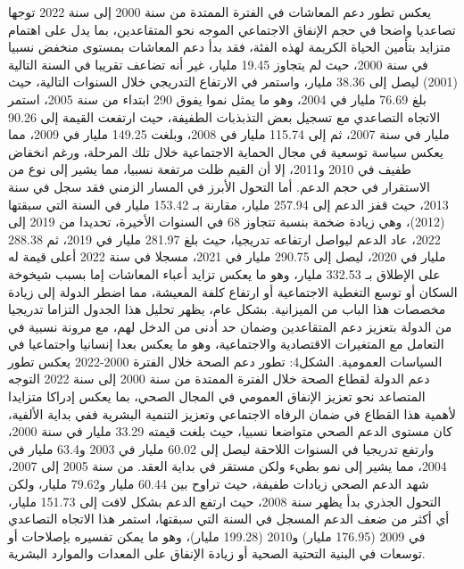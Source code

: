 \documentclass[12pt,a4paper]{report}
\begin{document}
يعكس تطور دعم المعاشات في الفترة الممتدة من سنة 2000 إلى سنة 2022 توجها تصاعديا واضحا في حجم الإنفاق الاجتماعي الموجه نحو المتقاعدين، بما يدل على اهتمام متزايد بتأمين الحياة الكريمة لهذه الفئة، فقد بدأ دعم المعاشات بمستوى منخفض نسبيا في سنة 2000، حيث لم يتجاوز 19.45 مليار، غير أنه تضاعف تقريبا في السنة التالية (2001) ليصل إلى 38.36 مليار، واستمر في الارتفاع التدريجي خلال السنوات التالية، حيث بلغ 76.69 مليار في 2004، وهو ما يمثل نموا يفوق 290%
ابتداء من سنة 2005، استمر الاتجاه التصاعدي مع تسجيل بعض التذبذبات الطفيفة، حيث ارتفعت القيمة إلى 90.26 مليار في سنة 2007، ثم إلى 115.74 مليار في 2008، وبلغت 149.25 مليار في 2009، مما يعكس سياسة توسعية في مجال الحماية الاجتماعية خلال تلك المرحلة، ورغم انخفاض طفيف في 2010 و2011، إلا أن القيم ظلت مرتفعة نسبيا، مما يشير إلى نوع من الاستقرار في حجم الدعم.
أما التحول الأبرز في المسار الزمني فقد سجل في سنة 2013، حيث قفز الدعم إلى 257.94 مليار، مقارنة بـ 153.42 مليار في السنة التي سبقتها (2012)، وهي زيادة ضخمة بنسبة تتجاوز 68%
في السنوات الأخيرة، تحديدا من 2019 إلى 2022، عاد الدعم ليواصل ارتفاعه تدريجيا، حيث بلغ 281.97 مليار في 2019، ثم 288.38 مليار في 2020، ليصل إلى 290.75 مليار في 2021، مسجلا في سنة 2022 أعلى قيمة له على الإطلاق بـ 332.53 مليار، وهو ما يعكس تزايد أعباء المعاشات إما بسبب شيخوخة السكان أو توسع التغطية الاجتماعية أو ارتفاع كلفة المعيشة، مما اضطر الدولة إلى زيادة مخصصات هذا الباب من الميزانية.
بشكل عام، يظهر تحليل هذا الجدول التزاما تدريجيا من الدولة بتعزيز دعم المتقاعدين وضمان حد أدنى من الدخل لهم، مع مرونة نسبية في التعامل مع المتغيرات الاقتصادية والاجتماعية، وهو ما يعكس بعدا إنسانيا واجتماعيا في السياسات العمومية.
الشكل4: تطور دعم الصحة خلال الفترة 2000-2022
يعكس تطور دعم الدولة لقطاع الصحة خلال الفترة الممتدة من سنة 2000 إلى سنة 2022 التوجه المتصاعد نحو تعزيز الإنفاق العمومي في المجال الصحي، بما يعكس إدراكا متزايدا لأهمية هذا القطاع في ضمان الرفاه الاجتماعي وتعزيز التنمية البشرية ففي بداية الألفية، كان مستوى الدعم الصحي متواضعا نسبيا، حيث بلغت قيمته 33.29 مليار في سنة 2000، وارتفع تدريجيا في السنوات اللاحقة ليصل إلى 60.02 مليار في 2003 و63.4 مليار في 2004، مما يشير إلى نمو بطيء ولكن مستقر في بداية العقد.
من سنة 2005 إلى 2007، شهد الدعم الصحي زيادات طفيفة، حيث تراوح بين 60.44 مليار و79.62 مليار، ولكن التحول الجذري بدأ يظهر سنة 2008، حيث ارتفع الدعم بشكل لافت إلى 151.73 مليار، أي أكثر من ضعف الدعم المسجل في السنة التي سبقتها، استمر هذا الاتجاه التصاعدي في 2009 (176.95 مليار) و2010 (199.28 مليار)، وهو ما يمكن تفسيره بإصلاحات أو توسعات في البنية التحتية الصحية أو زيادة الإنفاق على المعدات والموارد البشرية.
\end{document}
